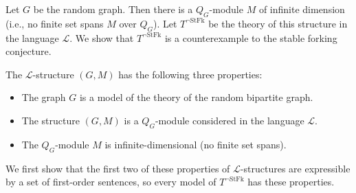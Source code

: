 \documentclass{amsart}
\theoremstyle{definition}
\theoremstyle{remark}
\numberwithin{equation}{section}
\begin{document}
Let $G$ be the random graph. Then there is a $Q_{G}$-module $M$ of infinite dimension (i.e., no finite set spans $M$ over $Q_{G}$). Let $T^{\neg \mathrm{StFk}}$ be the theory of this structure in the language $\mathcal{L}$. We show that $T^{\neg \mathrm{StFk}}$ is a counterexample to the stable forking conjecture.


The $\mathcal{L}$-structure $(G, M)$ has the following three properties:

\begin{itemize}
    \item The graph $G$ is a model of the theory of the random bipartite graph.

    \item The structure $(G, M)$ is a $Q_{G}$-module considered in the language $\mathcal{L}$.

    \item The $Q_{G}$-module $M$ is infinite-dimensional (no finite set spans).


    
\end{itemize}



We first show that the first two of these properties of $\mathcal{L}$-structures are expressible by a set of first-order sentences, so every model of $T^{\neg \mathrm{StFk}}$ has these properties.
\end{document}
